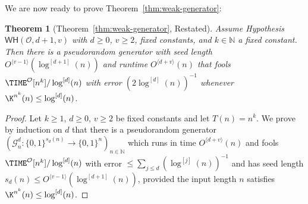 \documentclass[11pt]{article}
\newtheorem*{theorem*}{Theorem}
\newcommand{\B}{\{0,1\}}
\newcommand{\od}[1]{O^{\langle #1 \rangle}}
\newcommand{\WH}{\mathsf{WH}}
\begin{document}
We are now ready to prove Theorem~\ref{thm:weak-generator}:
\begin{theorem*}[Theorem~\ref{thm:weak-generator}, Restated]
Assume Hypothesis $\WH(\mathcal{O},d+1,v)$ with $d \geq 0$, $v \geq 2$, fixed constants, and $k \in \mathbb{N}$ a fixed constant. Then there is a pseudorandom generator with seed length $\od{v -1 }(\log^{[d+1]}(n))$ and runtime $\od{d+v}(n)$ that fools $\TIME^\mathcal{O}[n^k]/\log^{[d]}(n)$ with error $(2 \log^{[d]}(n))^{-1}$ whenever $\K^{n^k}(n) \leq \log^{[d]}(n)$.
\end{theorem*}
\begin{proof}
Let $k\geq 1$, $d \geq 0$, $v \geq 2$ be fixed constants and let $T(n) = n^k$.
We prove by induction on $d$ that there is a pseudorandom generator $(\mathcal{G}^d_n: \B^{s_d(n)} \to \B^n)_{n \in \mathbb{N}}$ which runs in time $\od{d + v}(n)$ and fools $\TIME^\mathcal{O}[n^k]/\log^{[d]}(n)$ with error $\leq \sum_{j \leq d} (\log^{[j]}(n))^{-1}$ and has seed length $s_d(n) \leq \od{v -1 }(\log^{[d+1]}(n))$, provided the input length $n$ satisfies $\K^{n^k}(n) \leq \log^{[d]}(n)$.


\end{proof}
\end{document}
